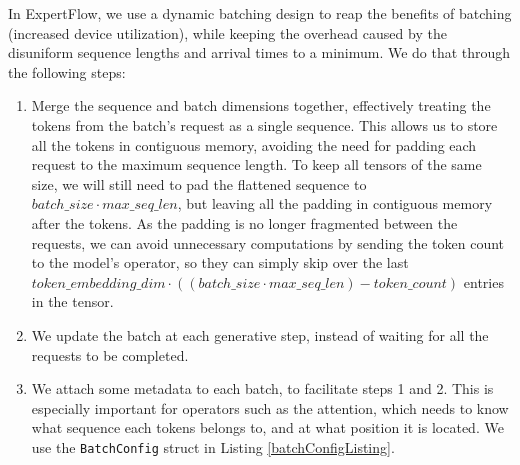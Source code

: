 In ExpertFlow, we use a dynamic batching design to reap the benefits of batching (increased device utilization), while keeping the overhead caused by the disuniform sequence lengths and arrival times to a minimum. We do that through the following steps:
\begin{enumerate}
    \item Merge the sequence and batch dimensions together, effectively treating the tokens from the batch's request as a single sequence. This allows us to store all the tokens in contiguous memory, avoiding the need for padding each request to the maximum sequence length. To keep all tensors of the same size, we will still need to pad the flattened sequence to $batch\_size \cdot max\_seq\_len$, but leaving all the padding in contiguous memory after the tokens. As the padding is no longer fragmented between the requests, we can avoid unnecessary computations by sending the token count to the model's operator, so they can simply skip over the last $token\_embedding\_dim \cdot ((batch\_size \cdot max\_seq\_len) - token\_count)$ entries in the tensor.
    \item We update the batch at each generative step, instead of waiting for all the requests to be completed. 
    \item We attach some metadata to each batch, to facilitate steps 1 and 2. This is especially important for operators such as the attention, which needs to know what sequence each tokens belongs to, and at what position it is located. We use the \texttt{BatchConfig} struct in Listing \ref{batchConfigListing}.
\end{enumerate}

